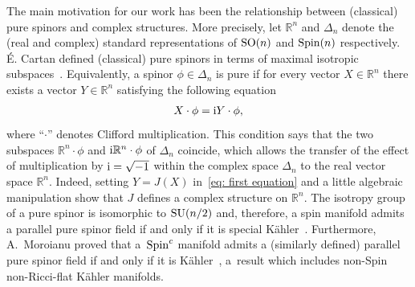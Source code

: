 \documentclass[pdftex]{sigma}
\numberwithin{equation}{section}
\begin{document}
The main motivation for our work has been the relationship between (classical) pure spinors and complex structures. More precisely,
let $\mathbb{R}^n$ and $\Delta_n$ denote the (real and complex) standard representations of ${\rm SO}(n)$ and ${\rm Spin}(n)$ respectively.
\'E. Cartan defined (classical) pure spinors in terms of maximal isotropic subspaces~\cite{Cartan}.
Equivalently, a spinor $\phi\in \Delta_n$ is pure if for every vector $X\in\mathbb{R}^n$ there exists a vector
$Y\in\mathbb{R}^n$ satisfying the following equation~\cite{Lawson}
\begin{gather}
X\cdot\phi = {\rm i}Y\cdot \phi,\label{eq: first equation}
\end{gather}
where ``$\cdot$'' denotes Clifford multiplication.
This condition says that the two subspaces $\mathbb{R}^n\cdot\phi$ and ${\rm i}\mathbb{R}^n\cdot\phi$ of
$\Delta_n$ coincide, which
allows the transfer of the effect of multiplication by ${\rm i}=\sqrt{-1}$ within the complex space
$\Delta_n$ to the real vector space $\mathbb{R}^n$.
Indeed, setting $Y=J(X)$ in~\eqref{eq: first equation} and a little algebraic manipulation show that $J$
defines a complex structure on $\mathbb{R}^n$. The isotropy group of a pure spinor is isomorphic to ${\rm SU}(n/2)$ and,
therefore, a spin manifold admits a parallel pure spinor field if and only if it is special K\"ahler~\cite{Lawson}.
Furthermore, A.~Moroianu proved that a~${\rm Spin}^c$ manifold admits a (similarly defined) parallel pure spinor field if
and only if it is K\"ahler~\cite{Moroianu}, a~result which includes non-Spin non-Ricci-flat K\"ahler manifolds.
\end{document}
